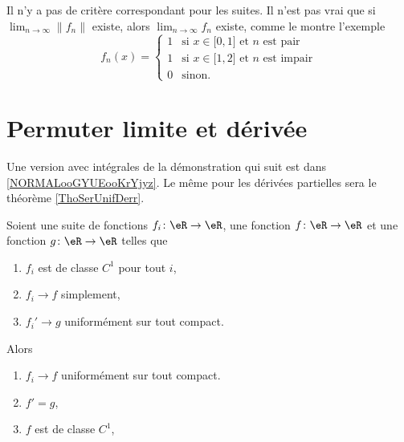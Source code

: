 \begin{remark}
    Il n'y a pas de critère correspondant pour les suites. Il n'est pas vrai que si \( \lim_{n\to \infty}\| f_n \| \) existe, alors \( \lim_{n\to \infty} f_n\) existe, comme le montre l'exemple
    \begin{equation}
        f_n(x)=\begin{cases}
            1    &   \text{si } x\in\mathopen[ 0 , 1 \mathclose]\text{ et } n\text{ est pair}\\
            1    &    \text{si } x\in\mathopen[ 1 , 2 \mathclose]\text{ et } n\text{ est impair}\\
             0   &    \text{sinon.}
        \end{cases}
    \end{equation}
\end{remark}

\section{Permuter limite et dérivée}

Une version avec intégrales de la démonstration qui suit est dans \ref{NORMALooGYUEooKrYjyz}. Le même pour les dérivées partielles sera le théorème  \ref{ThoSerUnifDerr}.
\begin{theorem}     \label{THOooXZQCooSRteSr}
    Soient une suite de fonctions \( f_i\colon \eR\to \eR\), une fonction \( f\colon \eR\to \eR\) et une fonction \( g\colon \eR\to \eR\) telles que
    \begin{enumerate}
        \item
            \( f_i\) est de classe \( C^1\) pour tout \( i\),
        \item
            \( f_i\to f\) simplement,
        \item
            \( f_i'\to g\) uniformément sur tout compact.
    \end{enumerate}
    Alors
    \begin{enumerate}
        \item       \label{ITEMooYSWDooFFeQCd}
            \( f_i\to f\) uniformément sur tout compact.
        \item       \label{ITEMooFAWUooVQJPZh}
            \( f'=g\),
        \item
            \( f\) est de classe \( C^1\),
    \end{enumerate}
\end{theorem}

